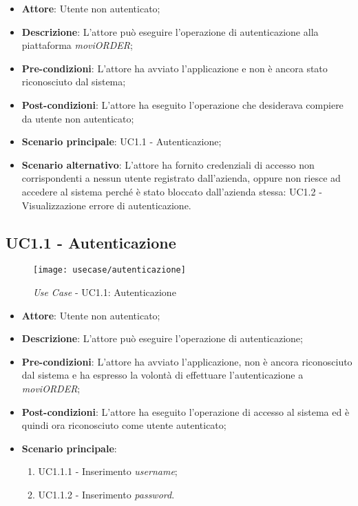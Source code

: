 \begin{itemize}
	\item \textbf{Attore}: Utente non autenticato;
	\item \textbf{Descrizione}: L'attore può eseguire l'operazione di autenticazione alla piattaforma \textit{moviORDER};
	\item \textbf{Pre-condizioni}: L'attore ha avviato l'applicazione e non è ancora stato riconosciuto dal sistema;
	\item \textbf{Post-condizioni}: L'attore ha eseguito l'operazione che desiderava compiere da utente non autenticato;
	\item \textbf{Scenario principale}: UC1.1 - Autenticazione;
	\item \textbf{Scenario alternativo}: L'attore ha fornito credenziali di accesso non corrispondenti a nessun utente registrato dall'azienda, oppure non riesce ad accedere al sistema perché è stato bloccato dall'azienda stessa: UC1.2 - Visualizzazione errore di autenticazione. 
\end{itemize}

\subsection{UC1.1 - Autenticazione}

\begin{figure}[!h] 
    \centering 
    \texttt{[image: usecase/autenticazione]} 
    \caption{\textit{Use Case} - UC1.1: Autenticazione}
\end{figure}

\begin{itemize}
	\item \textbf{Attore}: Utente non autenticato;
	\item \textbf{Descrizione}: L'attore può eseguire l'operazione di autenticazione;
	\item \textbf{Pre-condizioni}: L'attore ha avviato l'applicazione, non è ancora riconosciuto dal sistema e ha espresso la volontà di effettuare l'autenticazione a \textit{moviORDER};
	\item \textbf{Post-condizioni}: L'attore ha eseguito l'operazione di accesso al sistema ed è quindi ora riconosciuto come utente autenticato;
	\item \textbf{Scenario principale}: 
		\begin{enumerate}
			\item UC1.1.1 - Inserimento \textit{username};
			\item UC1.1.2 - Inserimento \textit{password}.
		\end{enumerate} 
\end{itemize}

